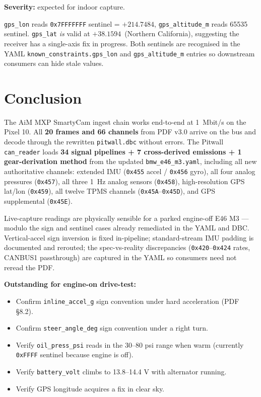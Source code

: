 \documentclass[11pt,a4paper]{article}
\newcommand{\hex}[1]{\texttt{0x#1}}
\begin{document}
\textbf{Severity:} expected for indoor capture.

\texttt{gps\_lon} reads \hex{7FFFFFFF} sentinel = $+214.7484$\textdegree,
\texttt{gps\_altitude\_m} reads 65535 sentinel. \texttt{gps\_lat}
\emph{is} valid at $+38.1594$\textdegree\ (Northern California),
suggesting the receiver has a single-axis fix in progress. Both
sentinels are recognised in the YAML
\texttt{known\_constraints.gps\_lon} and \texttt{gps\_altitude\_m}
entries so downstream consumers can hide stale values.

\section{Conclusion}

The AiM MXP SmartyCam ingest chain works end-to-end at \SI{1}{Mbit/s}
on the Pixel 10. All \textbf{20 frames and 66 channels} from PDF v3.0
arrive on the bus and decode through the rewritten \texttt{pitwall.dbc}
without errors. The Pitwall \texttt{can\_reader} loads \textbf{34
signal pipelines + 7 cross-derived emissions + 1 gear-derivation
method} from the updated \texttt{bmw\_e46\_m3.yaml}, including all
new authoritative channels: extended IMU (\hex{455} accel /
\hex{456} gyro), all four analog pressures (\hex{457}), all three
\SI{1}{Hz} analog sensors (\hex{458}), high-resolution GPS lat/lon
(\hex{459}), all twelve TPMS channels (\hex{45A}--\hex{45D}), and
GPS supplemental (\hex{45E}).

Live-capture readings are physically sensible for a parked
engine-off E46 M3 --- modulo the sign and sentinel cases already
remediated in the YAML and DBC. Vertical-accel sign inversion is
fixed in-pipeline; standard-stream IMU padding is documented and
rerouted; the spec-vs-reality discrepancies (\hex{420}--\hex{424}
rates, CANBUS1 passthrough) are captured in the YAML so consumers
need not reread the PDF.

\textbf{Outstanding for engine-on drive-test:}
\begin{itemize}\setlength\itemsep{2pt}
\item Confirm \texttt{inline\_accel\_g} sign convention under hard
       acceleration (PDF \S 8.2).
\item Confirm \texttt{steer\_angle\_deg} sign convention under a
       right turn.
\item Verify \texttt{oil\_press\_psi} reads in the 30--80 psi range
       when warm (currently \hex{FFFF} sentinel because engine is off).
\item Verify \texttt{battery\_volt} climbs to 13.8--14.4 V with
       alternator running.
\item Verify GPS longitude acquires a fix in clear sky.
\end{itemize}
\end{document}
